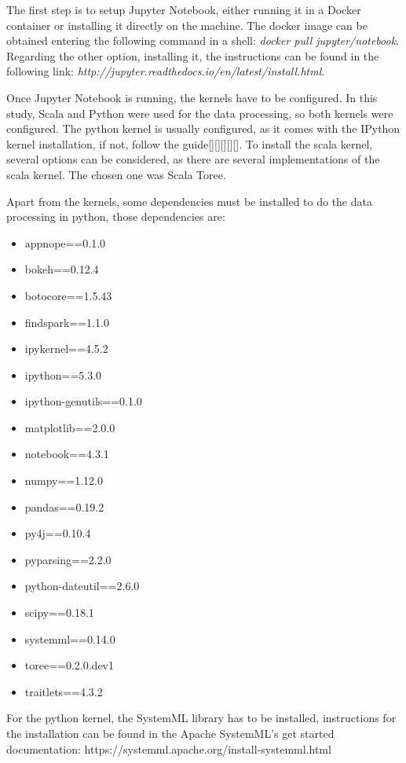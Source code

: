 \documentclass[11pt]{article} %
\begin{document}
    The first step is to setup Jupyter Notebook, either running it in a Docker container or installing it directly on the machine. The docker image can be obtained entering the following command in a shell: \emph{docker pull jupyter/notebook}. Regarding the other option, installing it, the instructions can be found in the following link: \emph{http://jupyter.readthedocs.io/en/latest/install.html}.

    Once Jupyter Notebook is running, the kernels have to be configured. In this study, Scala and Python were used for the data processing, so both kernels were configured. The python kernel is usually configured, as it comes with the IPython kernel installation, if not, follow the guide[][][][][]. To install the scala kernel, several options can be considered, as there are several implementations of the scala kernel. The chosen one was Scala Toree.

    Apart from the kernels, some dependencies must be installed to do the data processing in python, those dependencies are:

    \begin{itemize}
      \item appnope==0.1.0
      \item bokeh==0.12.4
      \item botocore==1.5.43
      \item findspark==1.1.0
      \item ipykernel==4.5.2
      \item ipython==5.3.0
      \item ipython-genutils==0.1.0
      \item matplotlib==2.0.0
      \item notebook==4.3.1
      \item numpy==1.12.0
      \item pandas==0.19.2
      \item py4j==0.10.4
      \item pyparsing==2.2.0
      \item python-dateutil==2.6.0
      \item scipy==0.18.1
      \item systemml==0.14.0
      \item toree==0.2.0.dev1
      \item traitlets==4.3.2
    \end{itemize}

    For the python kernel, the SystemML library has to be installed, instructions for the installation can be found in the Apache SystemML's get started documentation: https://systemml.apache.org/install-systemml.html
\end{document}
